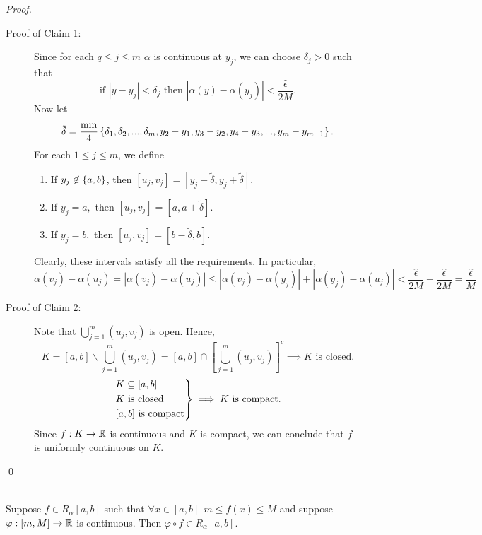 \begin{proof}
    \begin{description}
        \item[Proof of Claim 1: ] Since for each $q \leq j \leq m$ $\alpha$ is continuous at $y_j$, we can choose $\delta_j > 0$ such that 
        $$\text{if $|y-y_j| < \delta_j$ then $|\alpha(y) - \alpha(y_j)| < \frac{\hat{\epsilon}}{2M}$}.$$
        Now let
        $$\tilde{\delta} = \frac{\min}{4}\left\{\delta_1, \delta_2, ..., \delta_m, y_2-y_1, y_3-y_2, y_4-y_3, ..., y_m - y_{m-1}\right\}.$$
        For each $1 \leq j \leq m$, we define 
        \begin{enumerate}
            \item If $y_j \not \in \left\{a, b\right\}$, then $[u_j, v_j] = [y_j - \tilde{\delta}, y_j + \tilde{\delta}]$.
            \item If $y_j = a,$ then $[u_j, v_j] = [a, a+ \tilde{\delta}]$.
            \item If $y_j = b,$ then $[u_j, v_j] = [b-\tilde{\delta}, b]$.
        \end{enumerate}
        Clearly, these intervals satisfy all the requirements. In particular, 
        $$\alpha(v_j) - \alpha(u_j) = |\alpha(v_j) - \alpha(u_j)| \leq |\alpha(v_j) - \alpha(y_j)| + |\alpha(y_j) - \alpha(u_j)| < \frac{\hat{\epsilon}}{2M} + \frac{\hat{\epsilon}}{2M} = \frac{\hat{\epsilon}}{M}$$

        \item[Proof of Claim 2: ] Note that $\bigcup_{j=1}^m (u_j, v_j)$ is open. Hence,
        $$K = [a,b] \backslash \bigcup_{j=1}^m (u_j, v_j) = [a,b]\cap [\bigcup_{j=1}^m (u_j, v_j)]^c \implies K \text{ is closed.}$$
        $$\begin{rcases*}
            K \subseteq [a,b] \\
            K \text{ is closed} \\
            [a,b] \text{ is compact}
        \end{rcases*} \implies K \text{ is compact.}$$
        Since $f:K \to \mathbb{R}$ is continuous and $K$ is compact, we can conclude that $f$ is uniformly continuous on $K$.
    \end{description}
    \qed
\end{proof}

\begin{theorem}  \leavevmode \\
    \label{thm6.11}
    Suppose $f \in R_\alpha [a,b]$ such that $\forall x \in [a,b] ~~m \leq f(x) \leq M$ and suppose $\varphi: [m, M] \to \mathbb{R}$ is continuous. Then $\varphi \circ f \in R_\alpha [a,b]$.
\end{theorem}

